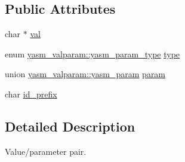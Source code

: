 \subsection*{Public Attributes}
\begin{DoxyCompactItemize}
\item 
char $\ast$ \hyperlink{structyasm__valparam_a9fc5a862572728e35f63948e784ba9e5}{val}
\item 
enum \hyperlink{structyasm__valparam_a3eefe852f229cec9d65ada6450484b86}{yasm\-\_\-valparam\-::yasm\-\_\-param\-\_\-type} \hyperlink{structyasm__valparam_a11e24b3f5e61c691e1f4baa2450fe409}{type}
\item 
union \hyperlink{unionyasm__valparam_1_1yasm__param}{yasm\-\_\-valparam\-::yasm\-\_\-param} \hyperlink{structyasm__valparam_a44bf972817e5c701378245bd59e14b29}{param}
\item 
char \hyperlink{structyasm__valparam_a49717972935d5096a239b8c3f1e35462}{id\-\_\-prefix}
\end{DoxyCompactItemize}


\subsection{Detailed Description}
Value/parameter pair. 

